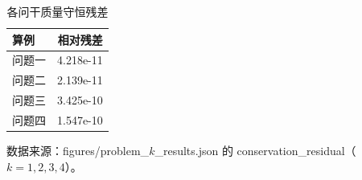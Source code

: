 \begin{table}[H]
  \centering
  \caption{各问干质量守恒残差}
  \label{tab:conservation}
  \begin{tabular}{lr}
    \toprule
    算例 & 相对残差 \\
    \midrule
    问题一 & 4.218e-11 \\
    问题二 & 2.139e-11 \\
    问题三 & 3.425e-10 \\
    问题四 & 1.547e-10 \\
    \bottomrule
  \end{tabular}
  \par\vspace{2pt}\footnotesize 数据来源：figures/problem\_$k$\_results.json 的 conservation\_residual（$k=1,2,3,4$）。
\end{table}
